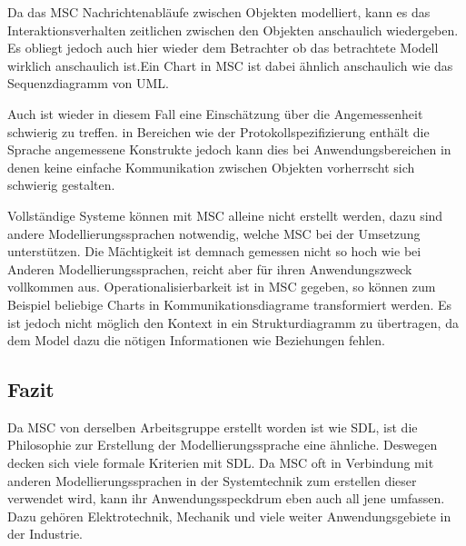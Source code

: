 Da das \ac{MSC} Nachrichtenabläufe zwischen Objekten modelliert, kann es das Interaktionsverhalten zeitlichen zwischen den Objekten anschaulich wiedergeben. Es obliegt jedoch auch hier wieder dem Betrachter ob das betrachtete Modell wirklich anschaulich ist.Ein Chart in \ac{MSC} ist dabei ähnlich anschaulich wie das Sequenzdiagramm von UML.

Auch ist wieder in diesem Fall eine Einschätzung über die Angemessenheit schwierig zu treffen. in Bereichen wie der Protokollspezifizierung enthält die Sprache angemessene Konstrukte jedoch kann dies bei Anwendungsbereichen in denen keine einfache Kommunikation zwischen Objekten vorherrscht sich schwierig gestalten.

Vollständige Systeme können mit \ac{MSC} alleine nicht erstellt werden, dazu sind andere Modellierungssprachen notwendig, welche \ac{MSC} bei der Umsetzung unterstützen. Die Mächtigkeit ist demnach gemessen nicht so hoch wie bei Anderen  Modellierungssprachen, reicht aber für ihren Anwendungszweck vollkommen aus.
Operationalisierbarkeit ist in \ac{MSC} gegeben, so können zum Beispiel beliebige Charts in Kommunikationsdiagrame transformiert werden. Es ist jedoch nicht möglich den Kontext in ein  Strukturdiagramm zu übertragen, da dem Model dazu die nötigen Informationen wie  Beziehungen fehlen.


\subsection{Fazit}
\label{sc:MSCFazit}
Da \ac{MSC} von derselben Arbeitsgruppe erstellt worden ist wie \ac{SDL}, ist die Philosophie zur Erstellung der Modellierungssprache eine ähnliche. Deswegen decken sich viele formale Kriterien mit \ac{SDL}. Da \ac{MSC} oft in Verbindung mit anderen Modellierungssprachen in der Systemtechnik zum erstellen dieser verwendet wird, kann ihr Anwendungsspeckdrum eben auch all jene umfassen. Dazu gehören Elektrotechnik, Mechanik und viele weiter Anwendungsgebiete in der Industrie.


